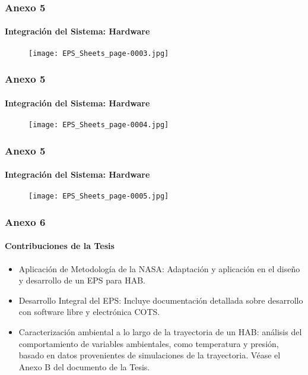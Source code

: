 
\begin{frame}
    \frametitle{Anexo 5}
    \framesubtitle{Integración del Sistema: Hardware}
    \begin{figure}[H]
        \centering
        \texttt{[image: EPS\_Sheets\_page-0003.jpg]} %
        \label{fig:Esquematico4}
    \end{figure}
\end{frame}


\begin{frame}
    \frametitle{Anexo 5}
    \framesubtitle{Integración del Sistema: Hardware}
    \begin{figure}[H]
        \centering
        \texttt{[image: EPS\_Sheets\_page-0004.jpg]} %
        \label{fig:Esquematico4}
    \end{figure}
\end{frame}


\begin{frame}
    \frametitle{Anexo 5}
    \framesubtitle{Integración del Sistema: Hardware}
    \begin{figure}[H]
        \centering
        \texttt{[image: EPS\_Sheets\_page-0005.jpg]} %
        \label{fig:Esquematico5}
    \end{figure}
\end{frame}


\begin{frame}
    \frametitle{Anexo 6}
    \framesubtitle{Contribuciones de la Tesis}
    \begin{itemize}
        \item Aplicación de Metodología de la NASA: Adaptación y aplicación en el diseño y desarrollo de un EPS para HAB.
        \item Desarrollo Integral del EPS: Incluye documentación detallada sobre desarrollo con software libre y electrónica COTS.
        \item Caracterización ambiental a lo largo de la trayectoria de un HAB: análisis del comportamiento de variables ambientales, como temperatura y presión, basado en datos provenientes de simulaciones de la trayectoria. Véase el Anexo B del documento de la Tesis.
    \end{itemize}
    
    
\end{frame}

